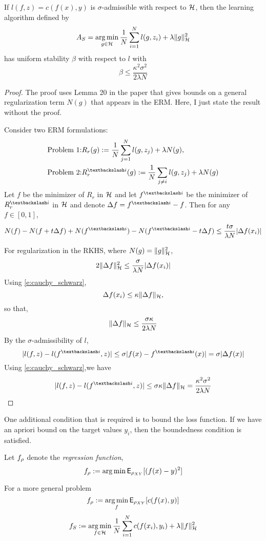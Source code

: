 \noindent \begin{theorem}
	If $l(f,z) = c(f(x),y)$ is $\sigma$-admissible with respect to ${\cal H}$, then the learning algorithm defined by 
	\[
	A_S = \mathop{\rm arg{\,}min}_{g \in {\cal H}} \frac{1}{N} \sum_{i=1}^N l(g, z_i) + \lambda \|g\|^2_{\cal H}
	\]
	has uniform stability $\beta$ with respect to $l$ with
	\[
	\beta \leq \frac{\kappa^2 \sigma^2}{2 \lambda N}
	\]
	\begin{proof}
		The proof uses Lemma 20 in the paper that gives bounds on a general regularization term $N(g)$ that appears in the ERM. Here, I just state the result without the proof. 
		\begin{lemma}
			Consider two ERM formulations:
			\[
			\begin{aligned}
			\text{Problem 1:} & R_r(g) := \frac{1}{N} \sum_{j=1}^N l(g, z_j) + \lambda N(g), \\
			\text{Problem 2:} & R_r^{\textbackslash i}(g) := \frac{1}{N} \sum_{j \neq i} l(g, z_j) + \lambda N(g)
			\end{aligned}
			\]
			Let $f$ be the minimizer of $R_r$ in ${\cal H}$ and let $f^{\textbackslash i}$ be the minimizer of $R_r^{\textbackslash i}$ in ${\cal H}$ and denote $\Delta f = f^{\textbackslash i } - f$. Then for any $f \in [0,1]$,
			\[
			N(f) - N(f+t \Delta f) + N(f^{\textbackslash i}) - N(f^{\textbackslash i} - t \Delta f) \leq \frac{t \sigma}{\lambda N}|\Delta f(x_i)|
			\]
		\end{lemma}
		
		For regularization in the RKHS, where $N(g) = \|g\|^2_{\cal H}$,
		\[
		2 \| \Delta f\|^2_{\cal H} \leq \frac{\sigma}{\lambda N} | \Delta f(x_i)|
		\] 
		Using \eqref{e:cauchy_schwarz}, 
		\[
		\Delta f(x_i) \leq \kappa \|\Delta f \|_{\cal H} ,
		\]
		so that, 
		\[
		\| \Delta f \|_{\cal H} \leq \frac{ \sigma \kappa}{2 \lambda N}
		\]
		By the $\sigma$-admissibility of $l$,
		\[
		| l(f,z) - l(f^{\textbackslash i},z)| \leq \sigma |f(x) - f^{\textbackslash i}(x)| = \sigma |\Delta f(x) |
		\]
		Using \eqref{e:cauchy_schwarz},we have 
		\[
		| l(f,z) - l(f^{\textbackslash i},z)| \leq \sigma \kappa \|\Delta f\|_\clH = \frac{\kappa^2 \sigma^2}{2 \lambda N}
		\]
	\end{proof}
\end{theorem}

One additional condition that is required is to bound the loss function. If we have an apriori bound on the target values $y_i$, then the boundedness condition is satisfied.


Let $f_\rho$ denote the \textit{regression function},
\[
f_\rho := \mathop{\rm arg{\,}min} {\sf E}_{\rho_{XY}}[(f(x) - y)^2]
\]

For a more general problem
\[
f_\rho := \mathop{\rm arg{\,}min}_f {\sf E}_{\rho_{XY}}[c(f(x), y)]
\]
\[
f_S := \mathop{\rm arg{\,}min}_{f \in {\cal H}} \frac{1}{N} \sum_{i=1}^N c(f(x_i), y_i) + \lambda \|f\|^2_{\cal H} 
\]